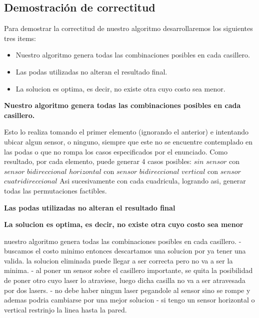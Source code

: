 \subsection{Demostración de correctitud}

Para demostrar la correctitud de nuestro algoritmo desarrollaremos los siguientes tres items:
\begin{itemize}
\item Nuestro algoritmo genera todas las combinaciones posibles en cada casillero.
\item Las podas utilizadas no alteran el resultado final.
\item La solucion es optima, es decir, no existe otra cuyo costo sea menor.
\end{itemize}

\textbf{Nuestro algoritmo genera todas las combinaciones posibles en cada casillero.} \newline

Esto lo realiza tomando el primer elemento (ignorando el anterior) e intentando ubicar algun sensor, o ninguno, siempre que este no se encuentre contemplado en las podas o que no rompa los casos especificados
 por el enunciado. Como resultado, por cada elemento, puede generar 4 casos posibles: \newline
 $sin$ $sensor$ \newline
 con $sensor$ $bidireccional$ $horizontal$  \newline
 con $sensor$ $bidireccional$ $vertical$  \newline
 con $sensor$ $cuatridireccional$ \newline
  Asi sucesivamente con cada cuadricula, logrando asi, generar todas las permutaciones factibles. 

\textbf{Las podas utilizadas no alteran el resultado final} \newline


\textbf{La solucion es optima, es decir, no existe otra cuyo costo sea menor} \newline


nuestro algoritmo genera todas las combinaciones posibles en cada casillero. - buscamos el costo minimo entonces descartamos una solucion por ya tener una valida. la solucion eliminada puede llegar a ser correcta pero no va a ser la minima.
- al poner un sensor sobre el casillero importante, se quita la posibilidad de poner otro cuyo laser lo atraviese, luego dicha casilla no va a ser atravesada por dos lasers.
- no debe haber ningun laser pegandole al sensor sino se rompe y ademas podria cambiarse por una mejor solucion
- si tengo un sensor horizontal o vertical restrinjo la linea hasta la pared.

